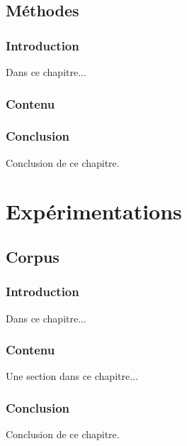 \documentclass[a4paper,11pt,twoside]{memoir}
\begin{document}
\chapter{Méthodes}
\label{chap:methodes}
\minitoc

\section{Introduction}
Dans ce chapitre...



\newpage

\section{Contenu}

%


\section{Conclusion}
Conclusion de ce chapitre.



\part{Expérimentations}





\chapter{Corpus}
\label{chap:corpus}
\minitoc

\section{Introduction}
Dans ce chapitre...



\section{Contenu}
Une section dans ce chapitre...

\section{Conclusion}
Conclusion de ce chapitre.
\end{document}
